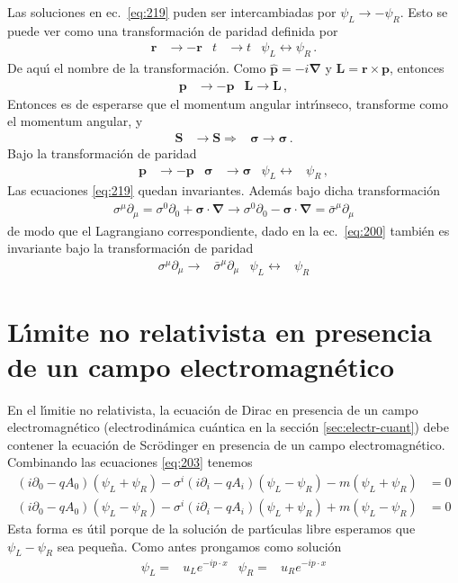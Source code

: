 Las soluciones en ec.~\eqref{eq:219} puden ser intercambiadas por $\psi_L\to -\psi_R$. Esto se puede ver como una transformaci\'on de paridad definida por
\begin{align}
  \mathbf{r}&\to-\mathbf{r}& t&\to t& \psi_L\leftrightarrow \psi_R\,.
\end{align}
De aqu\'\i{} el nombre de la transformaci\'on. Como $\hat{\mathbf{p}}=-i\boldsymbol{\nabla}$ y $\mathbf{L}=\mathbf{r}\times\mathbf{p}$, entonces
\begin{align}
  \mathbf{p}&\to-\mathbf{p}& \mathbf{L}\to\mathbf{L}\,,
\end{align}
Entonces es de esperarse que el momentum angular intr\'\i nseco, transforme como el momentum angular, y
\begin{align}
  \mathbf{S}&\to \mathbf{S}\Rightarrow& \boldsymbol{\sigma}\to\boldsymbol{\sigma}\,.
\end{align}
Bajo la transformaci\'on de paridad
\begin{align}
   \mathbf{p}&\to-\mathbf{p}& \boldsymbol{\sigma}&\to \boldsymbol{\sigma}& \psi_L\leftrightarrow &\psi_R\,,
\end{align}
Las ecuaciones \eqref{eq:219} quedan invariantes. Adem\'as bajo dicha transformaci\'on
\begin{align}
  \sigma^\mu\partial_\mu=\sigma^0\partial_0+\boldsymbol{\sigma}\cdot\boldsymbol{\nabla}\to \sigma^0\partial_0-\boldsymbol{\sigma}\cdot\boldsymbol{\nabla}=\bar{\sigma}^\mu\partial_\mu
\end{align}
de modo que el Lagrangiano correspondiente, dado en la ec.~\eqref{eq:200} tambi\'en es invariante bajo la transformaci\'on de paridad
\begin{align}
  \sigma^\mu\partial_\mu\to& \bar{\sigma}^\mu\partial_\mu &\psi_L\leftrightarrow &\psi_R
\end{align}



\section{L\'\i mite no relativista en presencia de un campo electromagn\'etico}
\label{sec:limite-no-relat}
En el l\'\i mitie no relativista, la ecuaci\'on de Dirac en presencia de un campo electromagn\'etico (electrodin\'amica cu\'antica en la secci\'on \ref{sec:electr-cuant}) debe contener la ecuaci\'on de Scr\"odinger en presencia de un campo electromagn\'etico.
Combinando las ecuaciones \eqref{eq:203} tenemos
\begin{align}
  \label{eq:204}
  (i\partial_0- q A_0)(\psi_L+\psi_R)-{\sigma}^i(i\partial_i-q A_i)(\psi_L-\psi_R) -m(\psi_L+\psi_R) &=0\nonumber\\
  (i\partial_0-q A_0)(\psi_L-\psi_R)-{\sigma}^i(i\partial_i-q A_i)(\psi_L+\psi_R) +m(\psi_L-\psi_R) &=0
\end{align}
Esta forma es \'util porque de la soluci\'on de part\'\i culas libre esperamos que $\psi_L-\psi_R$ sea peque\~na. 
Como antes prongamos como soluci\'on
\begin{align}
  \psi_L=&u_L e^{-i p\cdot x} & \psi_R=&u_R e^{-i p\cdot x}
\end{align}

